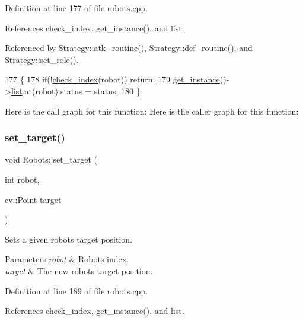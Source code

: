 Definition at line 177 of file robots.\+cpp.



References check\+\_\+index, get\+\_\+instance(), and list.



Referenced by Strategy\+::atk\+\_\+routine(), Strategy\+::def\+\_\+routine(), and Strategy\+::set\+\_\+role().


\begin{DoxyCode}
177                                              \{
178     \textcolor{keywordflow}{if}(!\hyperlink{robots_8hpp_ae3e6ae8f87cdc750c0b99bc609d9ae43}{check\_index}(robot)) \textcolor{keywordflow}{return};
179     \hyperlink{class_robots_a589bce74db5f34af384952d48435168f}{get\_instance}()->\hyperlink{class_robots_a2c6b77265028f82a4342ca1ef15ed305}{list}.at(robot).status = status;
180 \}
\end{DoxyCode}
Here is the call graph for this function\+:
Here is the caller graph for this function\+:
\mbox{\label{class_robots_ac1cd5c41b6e5d5643b2186ca51699c8f}} 
\subsubsection{\texorpdfstring{set\+\_\+target()}{set\_target()}}
{\footnotesize\ttfamily void Robots\+::set\+\_\+target (\begin{DoxyParamCaption}\item[{int}]{robot,  }\item[{cv\+::\+Point}]{target }\end{DoxyParamCaption})\hspace{0.3cm}{\ttfamily [static]}}

Sets a given robot\textquotesingle{}s target position. 
\begin{DoxyParams}{Parameters}
{\em robot} & \hyperlink{struct_robots_1_1_robot}{Robot}\textquotesingle{}s index. \\
\hline
{\em target} & The new robot\textquotesingle{}s target position. \\
\hline
\end{DoxyParams}


Definition at line 189 of file robots.\+cpp.



References check\+\_\+index, get\+\_\+instance(), and list.



